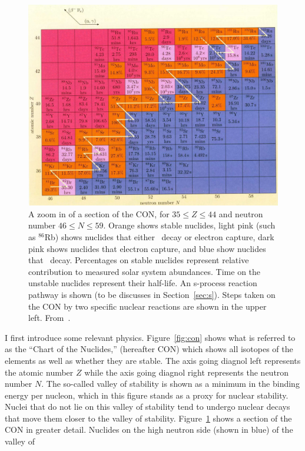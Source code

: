 \begin{figure}
\includegraphics[width=\linewidth]{pdf/con2.png}
\caption{\label{fig:con2} A zoom in of a section of the CON, for
  $35\leq Z \leq 44$ and neutron number $46\leq N \leq 59$.  Orange shows stable
  nuclides, light pink (such as $^{86}$Rb) shows nuclides that either
  \bminus\ decay or electron capture, dark pink shows nuclides that
  electron capture, and blue show nuclides that \bminus\ decay.
  Percentages on stable nuclides represent relative contribution to
  measured solar system abundances.  Time on the unstable nuclides
  represent their half-life.  An s-process reaction pathway is shown
  (to be discusses in Section~\ref{sec:s}). Steps taken on the CON by
  two specific nuclear reactions are shown in the upper left.  From~\cite{ryan2010}.}
\end{figure}
I first introduce some relevant physics.  Figure~\ref{fig:con}
shows what is referred to as the ``Chart of the Nuclides,'' (hereafter
CON) which
shows all isotopes of the elements as well as whether they are
stable.  The axis going diagnol left represents the atomic number $Z$ while the
axis going diagnol right represents the neutron number $N$.  The
so-called valley of stability is shown as a minimum in the binding
energy per nucleon, which in this figure stands as a proxy for nuclear
stability. Nuclei that do not lie on this valley of stability tend to
undergo nuclear decays that move them closer to the valley of
stability.  Figure~\ref{fig:con2} shows a section of the CON in
greater detail.  Nuclides on the high neutron side (shown in blue) of the valley of
